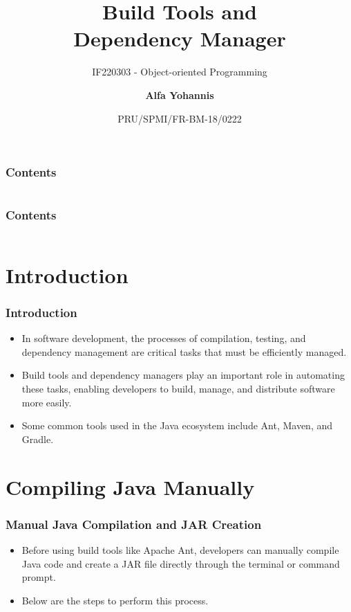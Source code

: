 \documentclass[aspectratio=169, table]{beamer}
\subtitle{IF220303 - Object-oriented Programming}
\title{\LARGE Build Tools and\\Dependency Manager\vspace{10pt}}
\date[Serial]{\scriptsize {PRU/SPMI/FR-BM-18/0222}}
\author[Pradita]{\small {\textbf{Alfa Yohannis}}}
\begin{document}
	
	\frame{\titlepage}
	
\begin{frame}[fragile]
	\frametitle{Contents}
	
	\begin{columns}[t]
		\tableofcontents[sections={1-2}]
		
		\tableofcontents[sections={3-4}]
	\end{columns}
\end{frame}

\begin{frame}[fragile]
	\frametitle{Contents}
	
	\begin{columns}[t]
		\tableofcontents[sections={5-6}]
		
		\tableofcontents[sections={7-8}]
	\end{columns}
\end{frame}

\section{Introduction}
\begin{frame}
	\frametitle{Introduction}
	\begin{itemize}
		\item In software development, the processes of compilation, testing, and dependency management are critical tasks that must be efficiently managed.
		\item Build tools and dependency managers play an important role in automating these tasks, enabling developers to build, manage, and distribute software more easily.
		\item Some common tools used in the Java ecosystem include Ant, Maven, and Gradle.
	\end{itemize}
\end{frame}

	
\section{Compiling Java Manually}

\begin{frame}
	\frametitle{Manual Java Compilation and JAR Creation}
	\begin{itemize}
		\item Before using build tools like Apache Ant, developers can manually compile Java code and create a JAR file directly through the terminal or command prompt.
		\item Below are the steps to perform this process.
	\end{itemize}
\end{frame}
\end{document}
